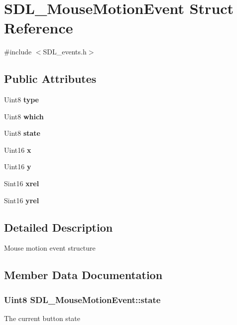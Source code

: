 \section{S\+D\+L\+\_\+\+Mouse\+Motion\+Event Struct Reference}
\label{struct_s_d_l___mouse_motion_event}


{\ttfamily \#include $<$S\+D\+L\+\_\+events.\+h$>$}

\subsection*{Public Attributes}
\begin{DoxyCompactItemize}
\item 
Uint8 {\bf type}
\item 
Uint8 {\bf which}
\item 
Uint8 {\bf state}
\item 
Uint16 {\bfseries x}\label{struct_s_d_l___mouse_motion_event_abf5b246feb0afbcabcef22b924eda8c3}

\item 
Uint16 {\bf y}
\item 
Sint16 {\bf xrel}
\item 
Sint16 {\bf yrel}
\end{DoxyCompactItemize}


\subsection{Detailed Description}
Mouse motion event structure 

\subsection{Member Data Documentation}
\subsubsection[{state}]{\setlength{\rightskip}{0pt plus 5cm}Uint8 S\+D\+L\+\_\+\+Mouse\+Motion\+Event\+::state}\label{struct_s_d_l___mouse_motion_event_a10434904d352c7165b9de5685d10dda6}
The current button state 
